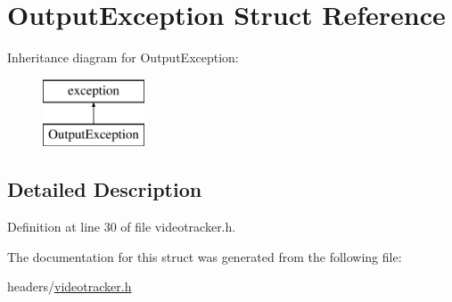 \hypertarget{structOutputException}{}\section{Output\+Exception Struct Reference}
\label{structOutputException}
Inheritance diagram for Output\+Exception\+:\begin{figure}[H]
\begin{center}
\leavevmode
\includegraphics[height=2.000000cm]{structOutputException}
\end{center}
\end{figure}


\subsection{Detailed Description}


Definition at line 30 of file videotracker.\+h.



The documentation for this struct was generated from the following file\+:\begin{DoxyCompactItemize}
\item 
headers/\hyperlink{videotracker_8h}{videotracker.\+h}\end{DoxyCompactItemize}
